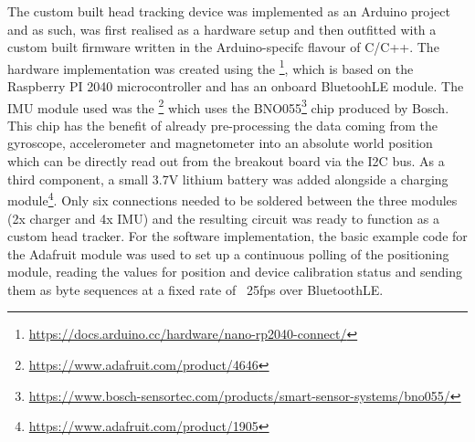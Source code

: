 The custom built head tracking device was implemented as an Arduino project and as such, was first realised as a hardware setup and then outfitted with a custom built firmware written in the Arduino-specifc flavour of C/C++.
The hardware implementation was created using the \footnote{\url{https://docs.arduino.cc/hardware/nano-rp2040-connect/}}, which is based on the Raspberry PI 2040 microcontroller and has an onboard BluetoohLE module.
The \ac{IMU} module used was the \footnote{\url{https://www.adafruit.com/product/4646}} which uses the BNO055\footnote{\url{https://www.bosch-sensortec.com/products/smart-sensor-systems/bno055/}} chip produced by Bosch.
This chip has the benefit of already pre-processing the data coming from the gyroscope, accelerometer and magnetometer into an absolute world position which can be directly read out from the breakout board via the \ac{I2C} bus.
As a third component, a small 3.7V lithium battery was added alongside a charging module\footnote{\url{https://www.adafruit.com/product/1905}}.
Only six connections needed to be soldered between the three modules (2x charger and 4x \ac{IMU}) and the resulting circuit was ready to function as a custom head tracker.
For the software implementation, the basic example code for the Adafruit module was used to set up a continuous polling of the positioning module, reading the values for position and device calibration status and sending them as byte sequences at a fixed rate of ~25fps over BluetoothLE.
